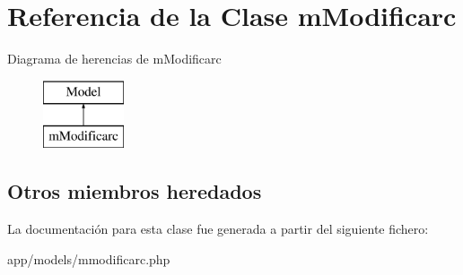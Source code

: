 \hypertarget{classm_modificarc}{}\section{Referencia de la Clase m\+Modificarc}
\label{classm_modificarc}
Diagrama de herencias de m\+Modificarc\begin{figure}[H]
\begin{center}
\leavevmode
\includegraphics[height=2.000000cm]{classm_modificarc}
\end{center}
\end{figure}
\subsection*{Otros miembros heredados}


La documentación para esta clase fue generada a partir del siguiente fichero\+:\begin{DoxyCompactItemize}
\item 
app/models/mmodificarc.\+php\end{DoxyCompactItemize}
